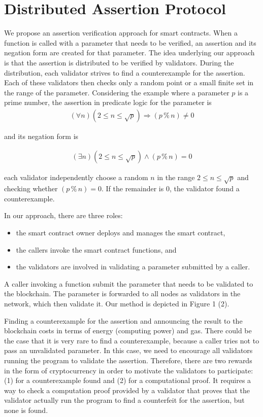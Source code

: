 \documentclass[runningheads]{llncs}
\begin{document}
\section{Distributed Assertion Protocol}
\label{sec:approach}
We propose an assertion verification approach for smart contracts. When a function is called with a parameter that needs to be verified, an assertion and its negation form are created for that parameter. The idea underlying our approach is that the assertion is distributed to be verified by validators. During the distribution, each validator strives to find a counterexample for the assertion. Each of these validators then checks only a random point or a small finite set  in the range of the parameter. Considering the example where a parameter $p$ is a prime number, the assertion in predicate logic for the parameter is 
\begin{gather}\label{eq:3a}
  (\forall n) (2 \le n \le \sqrt p) \Rightarrow (p \mathbin{\%} n) \ne 0
\end{gather}


\noindent and its negation form is 

\begin{gather}\label{eq:3b}
  (\exists n) (2 \le n \le \sqrt p) \wedge (p \mathbin{\%} n) = 0
\end{gather}

\noindent each validator independently choose a
random $n$ in the range $2 \le n \le 
\sqrt p$ and checking whether $(p \mathbin{\%} n) = 0$. If the remainder is $0$, the
validator found a counterexample.

In our approach, there are three roles: 
\begin{itemize}
   \item the smart contract owner deploys and manages the smart contract, 
   \item the callers invoke the smart contract functions, and 
   \item the validators are involved in validating a parameter submitted by a caller. 
\end{itemize}

\noindent A caller invoking a function submit the parameter that needs to be validated to the blockchain. The parameter is forwarded to all nodes as validators in the network, which then validate it. Our method is depicted in Figure 1 (2).

Finding a counterexample for the assertion and announcing the result to the blockchain costs in terms of energy (computing power) and gas. There could be the case that it is very rare to find a counterexample, because a caller tries not to pass an unvalidated parameter. In this case, we need to encourage all validators running the program to validate the assertion. Therefore, there are two rewards in the form of cryptocurrency in order to motivate the validators to participate: (1) for a  counterexample found and (2) for a computational proof.  It requires a way to check a computation proof provided by a validator that proves that the validator actually run the program to find a counterfeit for the assertion, but none is found.
\end{document}
